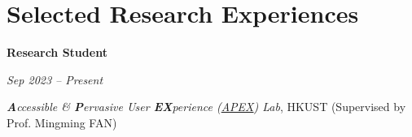 \documentclass[10pt, letterpaper]{article}
\newenvironment{twocolentry}[2][]{
    \onecolentry
    \def\secondColumn{#2}
    \setcolumnwidth{\fill, 4.5 cm}
    \begin{paracol}{2}
}{
    \switchcolumn \raggedleft \secondColumn
    \end{paracol}
    \endonecolentry
} %
\let\hrefWithoutArrow\href
\renewcommand{\href}[2]{\hrefWithoutArrow{#1}{\ifthenelse{\equal{#2}{}}{ }{#2 }\raisebox{.15ex}{\footnotesize \faExternalLink*}}}
\renewcommand{\href}[2]{\hrefWithoutArrow{#1}{#2}}
\begin{document}

    \section{Selected Research Experiences}


        \begin{twocolentry}{
        \textit{Sep 2023 – Present}}
            \textbf{Research Student}
        \end{twocolentry}
        \hspace{0.2cm}\textit{\textbf{A}ccessible \& \textbf{P}ervasive User \textbf{EX}perience (\href{https://www.mingmingfan.com/lab/}{APEX}) Lab}, HKUST (Supervised by Prof. Mingming FAN)
\end{document}
